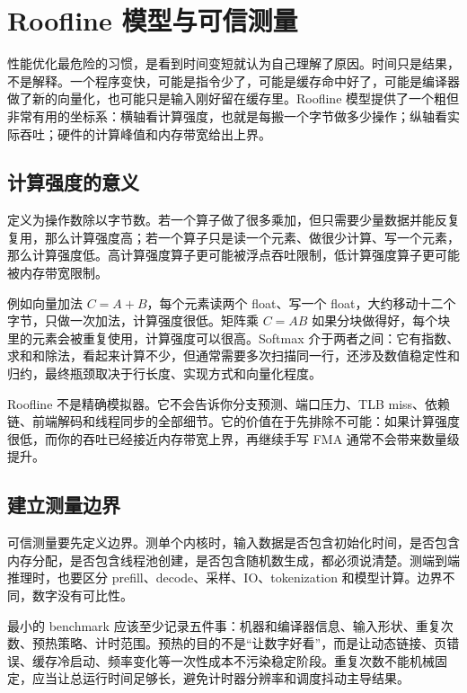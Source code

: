 \chapter{Roofline 模型与可信测量}

性能优化最危险的习惯，是看到时间变短就认为自己理解了原因。时间只是结果，不是解释。一个程序变快，可能是指令少了，可能是缓存命中好了，可能是编译器做了新的向量化，也可能只是输入刚好留在缓存里。Roofline 模型提供了一个粗但非常有用的坐标系：横轴看计算强度，也就是每搬一个字节做多少操作；纵轴看实际吞吐；硬件的计算峰值和内存带宽给出上界。

\section{计算强度的意义}

 定义为操作数除以字节数。若一个算子做了很多乘加，但只需要少量数据并能反复复用，那么计算强度高；若一个算子只是读一个元素、做很少计算、写一个元素，那么计算强度低。高计算强度算子更可能被浮点吞吐限制，低计算强度算子更可能被内存带宽限制。

例如向量加法 $C=A+B$，每个元素读两个 float、写一个 float，大约移动十二个字节，只做一次加法，计算强度很低。矩阵乘 $C=A B$ 如果分块做得好，每个块里的元素会被重复使用，计算强度可以很高。Softmax 介于两者之间：它有指数、求和和除法，看起来计算不少，但通常需要多次扫描同一行，还涉及数值稳定性和归约，最终瓶颈取决于行长度、实现方式和向量化程度。

\begin{deepdive}
Roofline 不是精确模拟器。它不会告诉你分支预测、端口压力、TLB miss、依赖链、前端解码和线程同步的全部细节。它的价值在于先排除不可能：如果计算强度很低，而你的吞吐已经接近内存带宽上界，再继续手写 FMA 通常不会带来数量级提升。
\end{deepdive}

\section{建立测量边界}

可信测量要先定义边界。测单个内核时，输入数据是否包含初始化时间，是否包含内存分配，是否包含线程池创建，是否包含随机数生成，都必须说清楚。测端到端推理时，也要区分 prefill、decode、采样、IO、tokenization 和模型计算。边界不同，数字没有可比性。

最小的 benchmark 应该至少记录五件事：机器和编译器信息、输入形状、重复次数、预热策略、计时范围。预热的目的不是“让数字好看”，而是让动态链接、页错误、缓存冷启动、频率变化等一次性成本不污染稳定阶段。重复次数不能机械固定，应当让总运行时间足够长，避免计时器分辨率和调度抖动主导结果。

